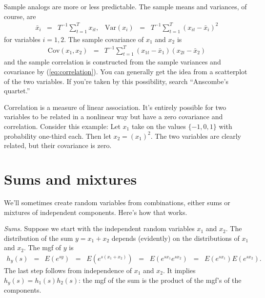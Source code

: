 \documentclass[11pt]{article}
\begin{document}
Sample analogs are more or less predictable.
The sample means and variances, of course, are
\begin{eqnarray*}
    \bar{x}_i &=& T^{-1} \sum_{t=1}^T x_{it}, \;\;\;
    \mbox{Var} (x_i) \;\;=\;\; T^{-1}
            \sum_{t=1}^T (x_{it} - \bar{x}_i)^2
\end{eqnarray*}
for variables $i=1,2$.
The sample covariance of $x_1$ and $x_2$ is
\begin{eqnarray*}
    \mbox{Cov} (x_1,x_2) &=& T^{-1}
            \sum_{t=1}^T (x_{1t} - \bar{x}_1) (x_{2t} - \bar{x}_2)
\end{eqnarray*}
and the sample correlation is constructed from the sample variances and covariance by
(\ref{eq:correlation}).
%
You can generally get the idea from a scatterplot of the two variables.
If you're taken by this possibility, search ``Anscombe's quartet.''


Correlation is a measure of linear association.
It's entirely possible for two variables to be related
in a nonlinear way but have a zero covariance and correlation.
Consider this example:
Let $x_1$ take on the values $\{-1,0,1\}$ with probability one-third each.
Then let $x_2 = (x_1)^2$.
The two variables are clearly related, but their covariance is zero.



\section{Sums and mixtures}

We'll sometimes create random variables from combinations, either
sums or mixtures of independent components.
Here's how that works.

{\it Sums.\/}
Suppose we start with the independent random variables $x_1$ and $x_2$.
The distribution of the sum $y = x_1+x_2$
depends (evidently) on the distributions of $x_1$ and $x_2$.
The mgf of $y$ is
\begin{eqnarray*}
    h_y(s) &=& E \left( e^{sy} \right)
            \;\;=\;\; E \left( e^{s(x_1+x_2)} \right)
            \;\;=\;\; E \left( e^{s x_1} e^{s x_2} \right)
            \;\;=\;\; E \left( e^{s x_1}\right) E \left( e^{s x_2} \right) .
\end{eqnarray*}
The last step follows from independence of $x_1$ and $x_2$.
It implies $h_y(s) = h_1(s) h_2(s)$:  the mgf of the sum
is the product of the mgf's of the components.
\end{document}
